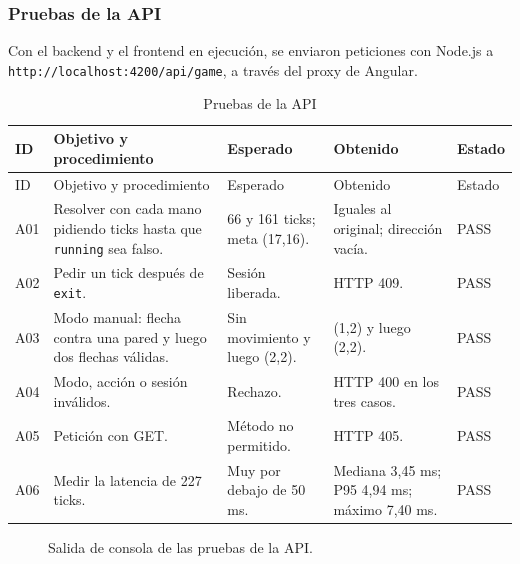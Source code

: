 \documentclass[12pt,a4paper]{article}
\begin{document}
\subsubsection{Pruebas de la API}
Con el backend y el frontend en ejecución, se enviaron peticiones con Node.js a
\texttt{http://localhost:4200/api/game}, a través del proxy de Angular.
\begin{longtable}{p{1cm}p{3.6cm}p{3.3cm}p{3.2cm}p{1.6cm}}
\caption{Pruebas de la API}\\
\toprule ID & Objetivo y procedimiento & Esperado & Obtenido & Estado\\\midrule\endfirsthead
\toprule ID & Objetivo y procedimiento & Esperado & Obtenido & Estado\\\midrule\endhead
A01 & Resolver con cada mano pidiendo ticks hasta que \texttt{running} sea falso. & 66 y 161 ticks; meta (17,16). & Iguales al original; dirección vacía. & PASS\\
A02 & Pedir un tick después de \texttt{exit}. & Sesión liberada. & HTTP 409. & PASS\\
A03 & Modo manual: flecha contra una pared y luego dos flechas válidas. & Sin movimiento y luego (2,2). & (1,2) y luego (2,2). & PASS\\
A04 & Modo, acción o sesión inválidos. & Rechazo. & HTTP 400 en los tres casos. & PASS\\
A05 & Petición con GET. & Método no permitido. & HTTP 405. & PASS\\
A06 & Medir la latencia de 227 ticks. & Muy por debajo de 50 ms. & Mediana 3,45 ms; P95 4,94 ms; máximo 7,40 ms. & PASS\\
\bottomrule
\end{longtable}

\begin{figure}[H]

\caption{Salida de consola de las pruebas de la API.}
\label{fig:consola-api}
\end{figure}
\end{document}

